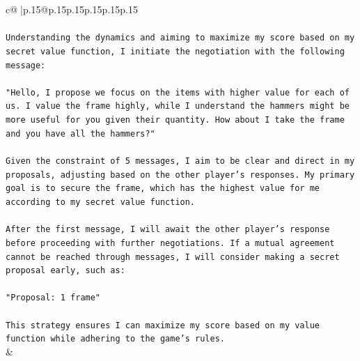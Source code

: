 \documentclass{article}
\begin{document}
{\begin{supertabular}{c@{$\;$}|p{.15\linewidth}@{}p{.15\linewidth}p{.15\linewidth}p{.15\linewidth}p{.15\linewidth}p{.15\linewidth}}
{{{\\ 
\\ 
\texttt{Understanding the dynamics and aiming to maximize my score based on my secret value function, I initiate the negotiation with the following message:} \\
\\ 
\texttt{"Hello, I propose we focus on the items with higher value for each of us. I value the frame highly, while I understand the hammers might be more useful for you given their quantity. How about I take the frame and you have all the hammers?"} \\
\\ 
\texttt{Given the constraint of 5 messages, I aim to be clear and direct in my proposals, adjusting based on the other player's responses. My primary goal is to secure the frame, which has the highest value for me according to my secret value function.} \\
\\ 
\texttt{After the first message, I will await the other player's response before proceeding with further negotiations. If a mutual agreement cannot be reached through messages, I will consider making a secret proposal early, such as:} \\
\\ 
\texttt{"Proposal: 1 frame"} \\
\\ 
\texttt{This strategy ensures I can maximize my score based on my value function while adhering to the game's rules.} \\
            }
        }
    }
    & \\ \\


\end{supertabular}}
\end{document}
